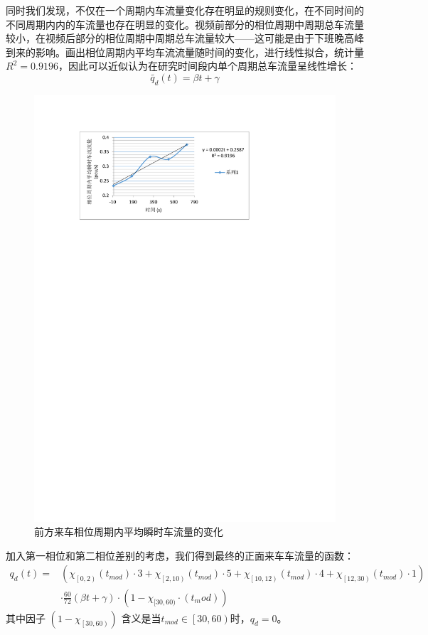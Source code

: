 \documentclass{cumcmart}
\begin{document}
同时我们发现，不仅在一个周期内车流量变化存在明显的规则变化，在不同时间的不同周期内内的车流量也存在明显的变化。视频前部分的相位周期中周期总车流量较小，在视频后部分的相位周期中周期总车流量较大------这可能是由于下班晚高峰到来的影响。画出相位周期内平均车流流量随时间的变化，进行线性拟合，统计量
${R}^{{2}}=0.9196$，因此可以近似认为在研究时间段内单个周期总车流量呈线性增长：
\begin{equation}
\tilde{q_{d}}\left( t \right)= {\beta t+\gamma }
\end{equation}
\begin{figure}[h]
\centering
\includegraphics[width=.6\textwidth]{fig4}
\caption{前方来车相位周期内平均瞬时车流量的变化}
\end{figure}

加入第一相位和第二相位差别的考虑，我们得到最终的正面来车车流量的函数：
\begin{align}
{q_d}\left( t \right) =& \left( {\chi _{\left[ {0,2} \right)}}\left( {{t_{mod}}} \right)\cdot3 + {\chi _{\left[ {2,10} \right)}}\left( {{t_{mod}}} \right)\cdot5 + {\chi _{\left[ {10,12} \right)}}\left( {{t_{mod}}} \right)\cdot4+ {\chi _{\left[ {12,30} \right)}}\left( {{t_{mod}}} \right)\cdot1 \right)\nonumber\\
&\cdot\frac{{60}}{{72}}\left( {{ {\beta t}} + { {\gamma }}} \right)\cdot(1-\chi_{[30,60)} \cdot (t_mod ))
\end{align}
其中因子 $({1-\chi}_{\left[30,60 \right)})$ 含义是当${t}_{mod }\in \left[ 30,60 \right)$时，${q}_{d}=0$。
\end{document}
